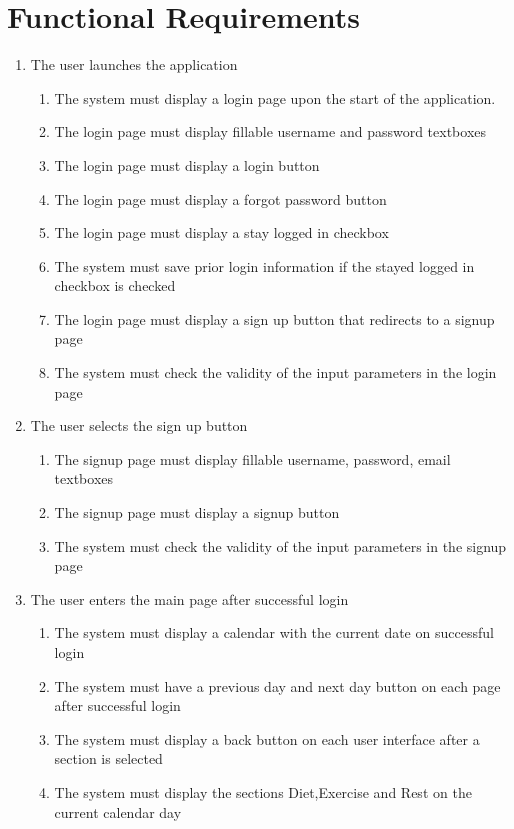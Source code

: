 \documentclass[12pt,letterpaper]{article}
\begin{document}
\section{Functional Requirements}
\begin{enumerate}[{BE}1.] 
\item The user launches the application
\begin{enumerate}[{FR}1.]
	\item  The system must display a login page upon the start of the application.
	\item  The login page must display fillable username and password  textboxes
	\item  The login page must display a login button
	\item  The login page must display a forgot password button
	\item  The login page must display a stay logged in checkbox
	\item  The system must save prior login information if the stayed logged in checkbox is checked
	\item  The login page must display a sign up button that redirects to a signup page
	\item  The system must check the validity of the input parameters in the login page
\end{enumerate}

\item The user selects the sign up button
\begin{enumerate}[resume*]
	\item  The signup page must display fillable username, password, email textboxes
	\item  The signup page must display a signup button
	\item  The system must check the validity of the input parameters in the signup page
\end{enumerate}

\item The user enters the main page after successful login
\begin{enumerate}[resume*]
	\item  The system must display a calendar with the current date on successful login
	\item  The system must have a previous day and next day button on each page after successful login
	\item  The system must display a back button on each user interface after a section is selected
	\item  The system must display the sections Diet,Exercise and Rest on the current calendar day
\end{enumerate}


\end{enumerate}
\end{document}
